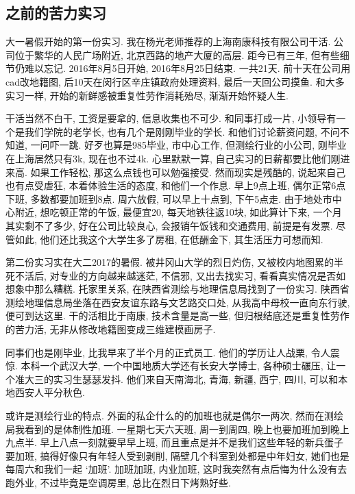 \documentclass[a4paper, UTF8,  12pt]{article}
\begin{document}
\subsection{之前的苦力实习}

大一暑假开始的第一份实习. 我在杨光老师推荐的上海南康科技有限公司干活. 公司位于繁华的人民广场附近, 北京西路的地产大厦的高层. 距今已有三年, 但有些细节仍难以忘记. 2016年8月5日开始, 2016年8月25日结束. 一共21天. 前十天在公司用cad改地籍图, 后10天在闵行区辛庄镇政府处理资料, 最后一天回公司摸鱼. 和大多实习一样, 开始的新鲜感被重复性劳作消耗殆尽, 渐渐开始怀疑人生. 

干活当然不白干, 工资是要拿的, 信息收集也不可少. 和同事打成一片, 小领导有一个是我们学院的老学长, 也有几个是刚刚毕业的学长. 和他们讨论薪资问题, 不问不知道, 一问吓一跳. 好歹也算是985毕业, 市中心工作, 但测绘行业的小公司, 刚毕业在上海居然只有3k, 现在也不过4k. 心里默默一算, 自己实习的日薪都要比他们刚进来高. 如果工作轻松, 那这么点钱也可以勉强接受. 然而现实是残酷的, 说起来自己也有点受虐狂, 本着体验生活的态度, 和他们一个作息. 早上9点上班, 偶尔正常6点下班, 多数都要加班到8点. 周六放假, 可以早上十点到, 下午5点走. 由于地处市中心附近, 想吃顿正常的午饭, 最便宜20, 每天地铁往返10块, 如此算计下来, 一个月其实剩不了多少, 好在公司比较良心, 会报销午饭钱和交通费用, 前提是有发票. 尽管如此, 他们还比我这个大学生多了房租, 在低酬金下, 其生活压力可想而知.

第二份实习实在大二2017的暑假. 被井冈山大学的烈日灼伤, 又被校内地图累的半死不活后, 对专业的方向越来越迷茫, 不信邪, 又出去找实习, 看看真实情况是否如想象中那么糟糕. 托家里关系, 在陕西省测绘与地理信息局找到了一份实习. 陕西省测绘地理信息局坐落在西安友谊东路与文艺路交口处, 从我高中母校一直向东行驶, 便可到达这里. 干的活相比于南康, 技术含量是高一些, 但归根结底还是重复性劳作的苦力活, 无非从修改地籍图变成三维建模画房子. 

同事们也是刚毕业, 比我早来了半个月的正式员工. 他们的学历让人战栗, 令人震惊. 本科一个武汉大学, 一个中国地质大学还有长安大学博士, 各种硕士碾压, 让一个准大三的实习生瑟瑟发抖. 他们来自天南海北, 青海, 新疆, 西宁, 四川, 可以和本地西安人平分秋色. 

或许是测绘行业的特点. 外面的私企什么的的加班也就是偶尔一两次, 然而在测绘局我看到的是体制性加班. 一星期七天六天班, 周一到周四, 晚上也要加班加到晚上九点半. 早上八点一刻就要早早上班, 而且重点是并不是我们这些年轻的新兵蛋子要加班, 搞得好像只有年轻人受到剥削, 隔壁几个科室到处都是中年妇女, 她们也是每周六和我们一起 \lq 加班\rq . 加班加班, 内业加班, 这时我突然有点后悔为什么没有去跑外业, 不过毕竟是空调房里, 总比在烈日下烤熟好些. 
\end{document}
